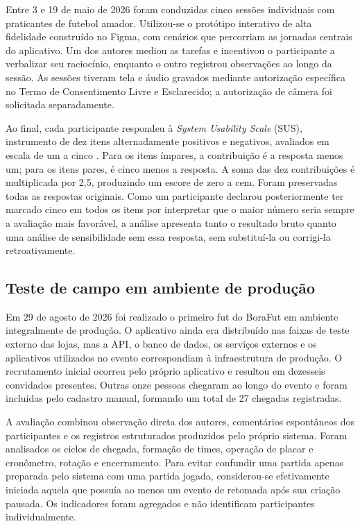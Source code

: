         Entre 3 e 19 de maio de 2026 foram conduzidas cinco sessões individuais com praticantes de futebol amador. Utilizou-se o protótipo interativo de alta fidelidade construído no Figma, com cenários que percorriam as jornadas centrais do aplicativo. Um dos autores mediou as tarefas e incentivou o participante a verbalizar seu raciocínio, enquanto o outro registrou observações ao longo da sessão. As sessões tiveram tela e áudio gravados mediante autorização específica no Termo de Consentimento Livre e Esclarecido; a autorização de câmera foi solicitada separadamente.

        Ao final, cada participante respondeu à \textit{System Usability Scale} (SUS), instrumento de dez itens alternadamente positivos e negativos, avaliados em escala de um a cinco \cite{brooke1996sus}. Para os itens ímpares, a contribuição é a resposta menos um; para os itens pares, é cinco menos a resposta. A soma das dez contribuições é multiplicada por 2,5, produzindo um escore de zero a cem. Foram preservadas todas as respostas originais. Como um participante declarou posteriormente ter marcado cinco em todos os itens por interpretar que o maior número seria sempre a avaliação mais favorável, a análise apresenta tanto o resultado bruto quanto uma análise de sensibilidade sem essa resposta, sem substituí-la ou corrigi-la retroativamente.

    \subsection{Teste de campo em ambiente de produção}

        Em 29 de agosto de 2026 foi realizado o primeiro fut do BoraFut em ambiente integralmente de produção. O aplicativo ainda era distribuído nas faixas de teste externo das lojas, mas a API, o banco de dados, os serviços externos e os aplicativos utilizados no evento correspondiam à infraestrutura de produção. O recrutamento inicial ocorreu pelo próprio aplicativo e resultou em dezesseis convidados presentes. Outras onze pessoas chegaram ao longo do evento e foram incluídas pelo cadastro manual, formando um total de 27 chegadas registradas.

        A avaliação combinou observação direta dos autores, comentários espontâneos dos participantes e os registros estruturados produzidos pelo próprio sistema. Foram analisados os ciclos de chegada, formação de times, operação de placar e cronômetro, rotação e encerramento. Para evitar confundir uma partida apenas preparada pelo sistema com uma partida jogada, considerou-se efetivamente iniciada aquela que possuía ao menos um evento de retomada após sua criação pausada. Os indicadores foram agregados e não identificam participantes individualmente.

